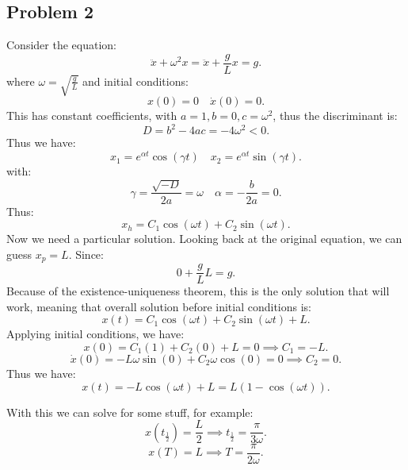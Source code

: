 \documentclass[../main/main.tex]{subfiles}
\begin{document}
\subsection{Problem 2}
Consider the equation: \[
	\ddot{x}+\omega^2 x= \ddot{x}+\frac{g}{L}x= g
.\] where $\omega=\sqrt{\frac{g}{L}} $ and initial conditions: \[
x(0) = 0 \quad\dot{x}(0) = 0
.\] This has constant coefficients, with $a=1, b=0, c=\omega^2$, thus the discriminant is: \[
D= b^2-4ac = -4\omega^2<0
.\] Thus we have: \[
x_1=e^{\alpha t} \cos(\gamma t) \quad x_2 = e^{\alpha t}\sin(\gamma t) 
.\] with: \[
\gamma = \frac{\sqrt{-D} }{2a}=\omega \quad \alpha=-\frac{b}{2a}=0       
.\] Thus: \[
x_h = C_1\cos(\omega t) + C_2 \sin(\omega t)
.\] Now we need a particular solution. Looking back at the original equation, we can guess $x_p = L$. Since: \[
0+\frac{g}{L}L=g
.\] Because of the existence-uniqueness theorem, this is the only solution that will work, meaning that overall solution before initial conditions is: \[
x(t) = C_1\cos(\omega t) + C_2\sin(\omega t) + L
.\] Applying initial conditions, we have: \[
x(0) = C_1(1) + C_2(0) + L = 0 \implies C_1 = -L
.\] \[
\dot{x}(0) = -L\omega\sin(0) + C_2\omega\cos(0) = 0 \implies C_2 = 0
.\] Thus we have: \[
x(t) = -L\cos(\omega t) + L = L(1-\cos(\omega t))
.\] 

With this we can solve for some stuff, for example: \[
	x(t_{\frac{1}{2}})=\frac{L}{2} \implies t_{\frac{1}{2}} = \frac{\pi}{3\omega}
.\]  \[
x(T) = L \implies T= \frac{\pi}{2\omega}
.\] 
\end{document}

